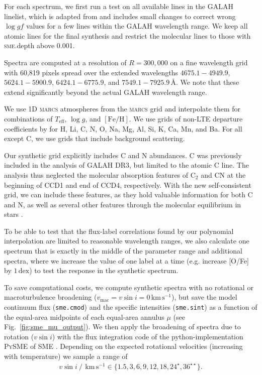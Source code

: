 \documentclass[
  journal=pasa,
  manuscript=research-paper, %
  year=2023,
  volume=37
]{cup-journal}
\newcommand{\Teff}{$T_\mathrm{eff}$\xspace}
\newcommand{\logg}{$\log g$\xspace}
\newcommand{\feh}{$\mathrm{[Fe/H]}$\xspace}
\newcommand{\vsini}{$v \sin i$\xspace}
\newcommand{\marcs}{\textsc{marcs}\xspace}
\newcommand{\dex}{\,\mathrm{dex}}	%
\newcommand{\Angstroem}{\,\text{\AA}}	%
\newcommand{\kms}{\,\mathrm{km\,s^{-1}}}	%
\begin{document}
For each spectrum, we first run a test on all available lines in the GALAH linelist, which is adapted from \citet{Heiter2021} and includes small changes to correct wrong $\log gf$ values for a few lines within the GALAH wavelength range. We keep all atomic lines for the final synthesis and restrict the molecular lines to those with \textsc{sme}.depth above 0.001.

Spectra are computed at a resolution of $R = 300,000$ on a fine wavelength grid with 60,819 pixels spread over the extended wavelengths $4675.1-4949.9$, $5624.1-5900.9$, $6424.1-6775.9$, and $7549.1-7925.9 \Angstroem$. We note that these extend significantly beyond the actual GALAH wavelength range.

We use 1D \marcs atmospheres from the \marcs grid \citep[][version 2014]{Gustafsson2008} and interpolate them for combinations of \Teff, \logg, and \feh. We use grids of non-LTE departure coefficients by \citet{Amarsi2020} for H, Li, C, N, O, Na, Mg, Al, Si, K, Ca, Mn, and Ba. For all except C, we use grids that include background scattering.

Our synthetic grid explicitly includes C and N abundances. C was previously included in the analysis of GALAH DR3, but limited to the atomic C line. The analysis thus neglected the molecular absorption features of $\mathrm{C_2}$ and CN at the beginning of CCD1 and end of CCD4, respectively. With the new self-consistent grid, we can include these features, as they hold valuable information for both C and N, as well as several other features through the molecular equilibrium in stars \citep[see e.g.][]{Ting2018}.

To be able to test that the flux-label correlations found by our polynomial interpolation are limited to reasonable wavelength ranges, we also calculate one spectrum that is exactly in the middle of the parameter range and additional spectra, where we increase the value of one label at a time (e.g. increase [O/Fe] by $1\dex$) to test the response in the synthetic spectrum.

To save computational costs, we compute synthetic spectra with no rotational or macroturbulence broadening ($v_\text{mac} = v\sin i = 0\kms$), but save the model continuum flux (\texttt{sme.cmod}) and the specific intensities (\texttt{sme.sint}) as a function of the equal-area midpoints of each equal-area annulus $\mu$ (see Fig.~\ref{fig:sme_mu_output}). We then apply the broadening of spectra due to rotation (\vsini) with the flux integration code of the python-implementation \textsc{PySME} \citep{Wehrhahn2021} of \textsc{SME} \citep{Piskunov2017}. Depending on the expected rotational velocities (increasing with temperature) we sample a range of
\begin{align} \label{eq:vsini}
    v \sin i~/~\kms \in \{ 1.5, 3, 6, 9, 12, 18, 24^\star, 36^{\star \star}\}.
\end{align}
\end{document}
